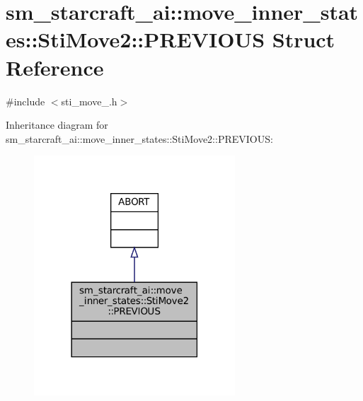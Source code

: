 \hypertarget{structsm__starcraft__ai_1_1move__inner__states_1_1StiMove2_1_1PREVIOUS}{}\section{sm\+\_\+starcraft\+\_\+ai\+:\+:move\+\_\+inner\+\_\+states\+:\+:Sti\+Move2\+:\+:P\+R\+E\+V\+I\+O\+US Struct Reference}
\label{structsm__starcraft__ai_1_1move__inner__states_1_1StiMove2_1_1PREVIOUS}


{\ttfamily \#include $<$sti\+\_\+move\+\_.\+h$>$}



Inheritance diagram for sm\+\_\+starcraft\+\_\+ai\+:\+:move\+\_\+inner\+\_\+states\+:\+:Sti\+Move2\+:\+:P\+R\+E\+V\+I\+O\+US\+:
\nopagebreak
\begin{figure}[H]
\begin{center}
\leavevmode
\includegraphics[width=213pt]{structsm__starcraft__ai_1_1move__inner__states_1_1StiMove2_1_1PREVIOUS__inherit__graph}
\end{center}
\end{figure}


